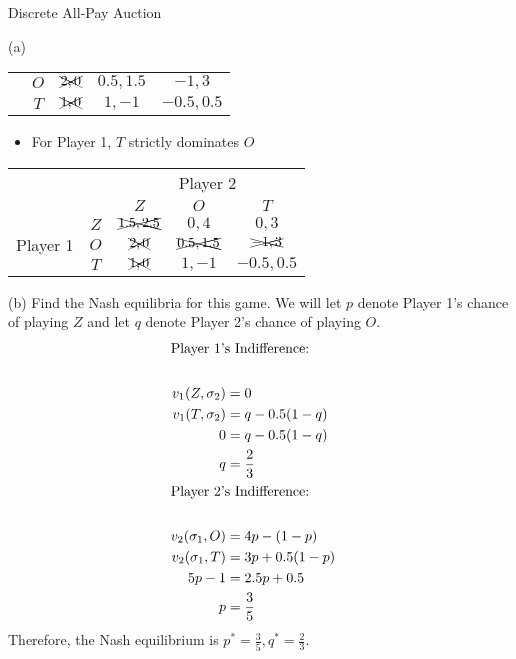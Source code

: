 \documentclass[8pt]{extarticle}
\begin{document}
\begin{problem}{Discrete All-Pay Auction}
\begin{problem}{(a)}
\begin{center}
\begin{tabular}{cc|c|c|c|}
          \cline{3-5}
                                      & $O$ & $\xcancel{2,0}$ & $0.5,1.5$ & $-1,3$\\
                                      \cline{3-5}
                                      & $T$ & $\xcancel{1,0}$ & $1,-1$ & $-0.5,0.5$\\
                                      \cline{3-5}
        \end{tabular}
      \end{center}
      \begin{itemize}
        \item For Player 1, $T$ strictly dominates $O$
      \end{itemize}
      \begin{center}
        \renewcommand{\arraystretch}{1.5}
        \begin{tabular}{cc|c|c|c|}
          & \multicolumn{1}{c}{} & \multicolumn{3}{c}{Player 2} \\
          & \multicolumn{1}{c}{} & \multicolumn{1}{c}{$Z$} & \multicolumn{1}{c}{$O$} & \multicolumn{1}{c}{$T$}\\
          \cline{3-5}
          \multirow{3}{2em}{Player 1} & $Z$ & $\xcancel{1.5,2.5}$ & $0,4$ & $0,3$ \\
          \cline{3-5}
                                      & $O$ & $\xcancel{2,0}$ & $\xcancel{0.5,1.5}$ & $\xcancel{-1,3}$\\
                                      \cline{3-5}
                                      & $T$ & $\xcancel{1,0}$ & $1,-1$ & $-0.5,0.5$\\
                                      \cline{3-5}
        \end{tabular}
      \end{center}
    \end{problem}
    \begin{problem}{(b)}
      Find the Nash equilibria for this game.
      \tcblower
      We will let $p$ denote Player 1's chance of playing $Z$ and let $q$ denote Player 2's chance of playing $O$.
      \begin{align*}
        \shortintertext{Player 1's Indifference:}\\
        v_1(Z,\sigma_2) &= 0\\
        v_1(T,\sigma_2) &= q - 0.5(1-q)\\
        0 &= q - 0.5(1-q) \\
        q &= \frac{2}{3}\\
        \shortintertext{Player 2's Indifference:}\\
        v_2(\sigma_1,O) &= 4p - (1-p)\\
        v_2(\sigma_1,T) &= 3p + 0.5(1-p)\\
        5p-1 &= 2.5p + 0.5\\
        p &= \frac{3}{5}
      \end{align*}
      Therefore, the Nash equilibrium is $p^* = \frac{3}{5},q^* = \frac{2}{3}$.
    \end{problem}
  \end{problem}
\end{document}
